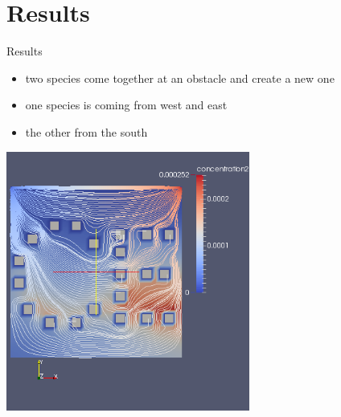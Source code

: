 \documentclass[t,mathserif]{beamer}
\begin{document}
\section{Results}
\begin{frame}[allowframebreaks]{Results}
\begin{itemize}
	\item two species come together at an obstacle and create a new one
	\item one species is coming from west and east
	\item the other from the south
\end{itemize}
\framebreak
\begin{center}
\includegraphics[width=0.6\textwidth]{result1.png}
\end{center}
\end{frame}
\end{document}
